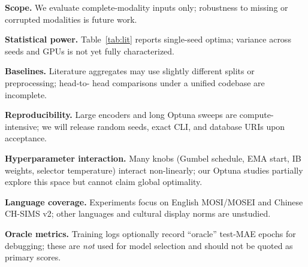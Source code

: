 \textbf{Scope.}
We evaluate complete-modality inputs only; robustness to missing or corrupted
modalities is future work.

\textbf{Statistical power.}
Table~\ref{tab:lit} reports single-seed optima; variance across seeds and GPUs is
not yet fully characterized.

\textbf{Baselines.}
Literature aggregates may use slightly different splits or preprocessing; head-to-
head comparisons under a unified codebase are incomplete.

\textbf{Reproducibility.}
Large encoders and long Optuna sweeps are compute-intensive; we will release
random seeds, exact CLI, and database URIs upon acceptance.

\textbf{Hyperparameter interaction.}
Many knobs (Gumbel schedule, EMA start, IB weights, selector temperature) interact
non-linearly; our Optuna studies partially explore this space but cannot claim
global optimality.

\textbf{Language coverage.}
Experiments focus on English MOSI/MOSEI and Chinese CH-SIMS v2; other languages
and cultural display norms are unstudied.

\textbf{Oracle metrics.}
Training logs optionally record ``oracle'' test-MAE epochs for debugging; these
are \emph{not} used for model selection and should not be quoted as primary
scores.
